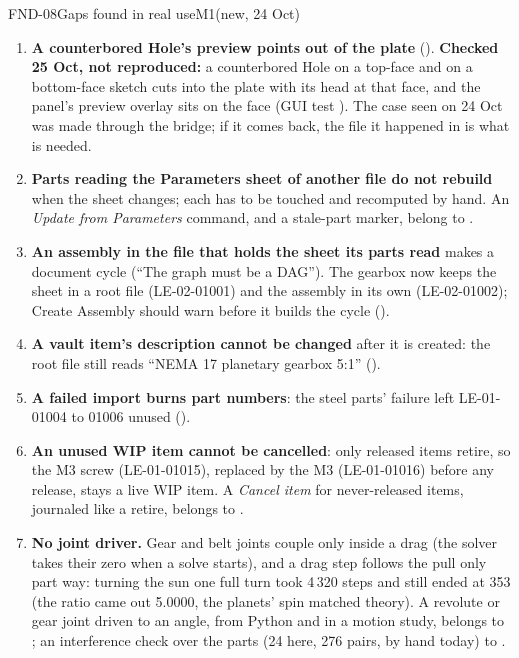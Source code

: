 \begin{epic}{FND-08}{Gaps found in real use}{M1}{\stTodo}{(new, 24 Oct)}
\begin{enumerate}[nosep]
        face centre is (40,30,8). Fusion and SolidWorks do the same, so I left it; question for you below.
  \item \textbf{A counterbored Hole's preview points out of the plate} (). \textbf{Checked 25 Oct, not
        reproduced:} a counterbored Hole on a top-face and on a bottom-face sketch cuts into the plate with its head at
        that face, and the panel's preview overlay sits on the face (GUI test ). The case seen
        on 24 Oct was made through the bridge; if it comes back, the file it happened in is what is needed.
  \item \textbf{Parts reading the Parameters sheet of another file do not rebuild} when the sheet changes; each has
        to be touched and recomputed by hand. An \emph{Update from Parameters} command, and a stale-part marker,
        belong to .
  \item \textbf{An assembly in the file that holds the sheet its parts read} makes a document cycle (``The graph
        must be a DAG''). The gearbox now keeps the sheet in a root file (LE-02-01001) and the assembly in its own
        (LE-02-01002); Create Assembly should warn before it builds the cycle ().
  \item \textbf{A vault item's description cannot be changed} after it is created: the root file still reads
        ``NEMA 17 planetary gearbox 5:1'' ().
  \item \textbf{A failed import burns part numbers}: the steel parts' failure left LE-01-01004 to 01006 unused
        ().
  \item \textbf{An unused WIP item cannot be cancelled}: only released items retire, so the M3 screw
        (LE-01-01015), replaced by the M3 (LE-01-01016) before any release, stays a live WIP item. A
        \emph{Cancel item} for never-released items, journaled like a retire, belongs to .
  \item \textbf{No joint driver.} Gear and belt joints couple only inside a drag (the solver takes their zero
        when a solve starts), and a drag step follows the pull only part way: turning the sun one full turn took
        4\,320 steps and still ended at 353\textdegree{} (the ratio came out 5.0000, the planets' spin matched
        theory). A revolute or gear joint driven to an angle, from Python and in a motion study, belongs to
        ; an interference check over the parts (24 here, 276 pairs, by hand today) to .

\end{enumerate}
\end{epic}
